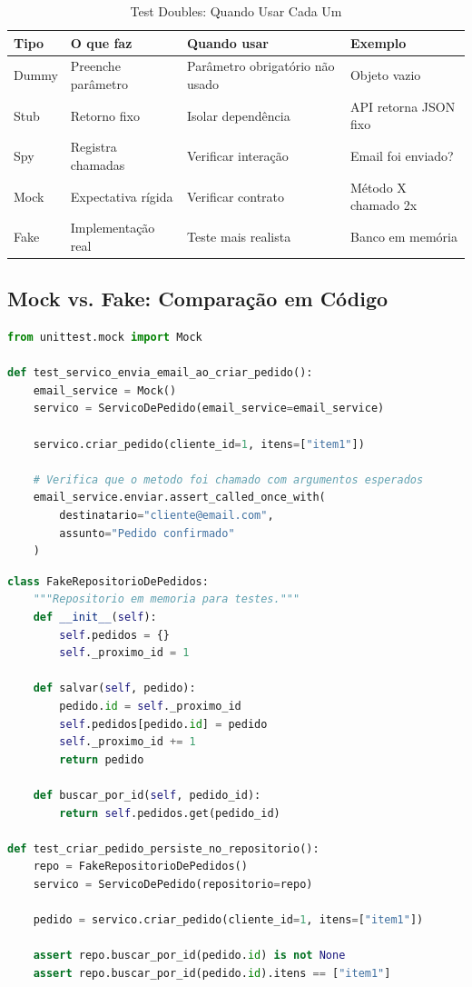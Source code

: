 \begin{table}[htbp]
\centering
\caption{Test Doubles: Quando Usar Cada Um}
\begin{tabular}{@{}llll@{}}
\toprule
\textbf{Tipo} & \textbf{O que faz} & \textbf{Quando usar} & \textbf{Exemplo} \\
\midrule
Dummy & Preenche parâmetro & Parâmetro obrigatório não usado & Objeto vazio \\
Stub & Retorno fixo & Isolar dependência & API retorna JSON fixo \\
Spy & Registra chamadas & Verificar interação & Email foi enviado? \\
Mock & Expectativa rígida & Verificar contrato & Método X chamado 2x \\
Fake & Implementação real & Teste mais realista & Banco em memória \\
\bottomrule
\end{tabular}
\end{table}

\subsection{Mock vs. Fake: Comparação em Código}

\begin{lstlisting}[language=Python, caption={Usando Mock: verifica interação}]
from unittest.mock import Mock

def test_servico_envia_email_ao_criar_pedido():
    email_service = Mock()
    servico = ServicoDePedido(email_service=email_service)

    servico.criar_pedido(cliente_id=1, itens=["item1"])

    # Verifica que o metodo foi chamado com argumentos esperados
    email_service.enviar.assert_called_once_with(
        destinatario="cliente@email.com",
        assunto="Pedido confirmado"
    )
\end{lstlisting}

\begin{lstlisting}[language=Python, caption={Usando Fake: implementação simplificada}]
class FakeRepositorioDePedidos:
    """Repositorio em memoria para testes."""
    def __init__(self):
        self.pedidos = {}
        self._proximo_id = 1

    def salvar(self, pedido):
        pedido.id = self._proximo_id
        self.pedidos[pedido.id] = pedido
        self._proximo_id += 1
        return pedido

    def buscar_por_id(self, pedido_id):
        return self.pedidos.get(pedido_id)

def test_criar_pedido_persiste_no_repositorio():
    repo = FakeRepositorioDePedidos()
    servico = ServicoDePedido(repositorio=repo)

    pedido = servico.criar_pedido(cliente_id=1, itens=["item1"])

    assert repo.buscar_por_id(pedido.id) is not None
    assert repo.buscar_por_id(pedido.id).itens == ["item1"]
\end{lstlisting}


